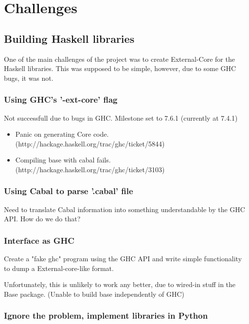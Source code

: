 

\chapter{Challenges}



\section{Building Haskell libraries}

One of the main challenges of the project was to create External-Core for
the Haskell libraries. This was supposed to be simple, however, due to some GHC
bugs, it was not.

\subsection{Using GHC's '-ext-core' flag}

Not successfull due to bugs in GHC. Milestone set to 7.6.1 (currently at 7.4.1)

\begin{itemize}
\item Panic on generating Core code. (http://hackage.haskell.org/trac/ghc/ticket/5844) 
\item Compiling base with cabal fails. (http://hackage.haskell.org/trac/ghc/ticket/3103)
\end{itemize}

\subsection{Using Cabal to parse '.cabal' file}

Need to translate Cabal information into something understandable by
the GHC API. How do we do that?

\subsection{Interface as GHC}

Create a "fake ghc" program using the GHC API and write simple functionality to 
dump a External-core-like format.

Unfortunately, this is unlikely to work any better, due to wired-in stuff in the
Base package. (Unable to build base independently of GHC)

\subsection{Ignore the problem, implement libraries in Python}

